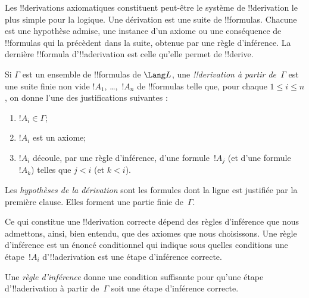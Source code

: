 \documentclass[../../../include/open-logic-section]{subfiles}
\begin{document}
      {}
      {}


\begin{explain}
Les !!{derivation}s axiomatiques constituent peut-être le système de
!!{derivation} le plus simple pour la logique. Une dérivation est une
suite de !!{formula}s. Chacune est une hypothèse admise, une instance
d'un axiome ou une conséquence de !!{formula}s qui la précèdent dans
la suite, obtenue par une règle d'inférence. La dernière !!{formula}
d'!!a{derivation} est celle qu'elle permet de !!{derive}.
%
\end{explain}

\begin{defn}[!!^{derivation}]
Si $\Gamma$ est un ensemble de !!{formula}s de $\Lang L$, une
\emph{!!{derivation} à partir de~$\Gamma$} est une suite finie non vide
$!A_1$, \dots,~$!A_n$ de !!{formula}s telle que, pour chaque
$1 \le i \le n$, on donne l'une des justifications suivantes :
\begin{enumerate}
\item $!A_i \in \Gamma$;
\item $!A_i$ est un axiome;
\item $!A_i$ découle, par une règle d'inférence, d'une formule~$!A_j$
  (et d'une formule~$!A_k$) telles que $j < i$ (et $k < i$).
\end{enumerate}
Les \emph{hypothèses de la dérivation} sont les formules dont la ligne
est justifiée par la première clause. Elles forment une partie finie
de~$\Gamma$.
\end{defn}


Ce qui constitue une !!{derivation} correcte dépend des règles
d'inférence que nous admettons, ainsi, bien entendu, que des axiomes
que nous choisissons. Une règle d'inférence est un énoncé conditionnel
qui indique sous quelles conditions une étape~$!A_i$ d'!!a{derivation}
est une étape d'inférence correcte.

\begin{defn}
Une \emph{règle d'inférence} donne une condition suffisante pour
qu'une étape d'!!a{derivation} à partir de~$\Gamma$ soit une étape
d'inférence correcte.
\end{defn}
\end{document}
